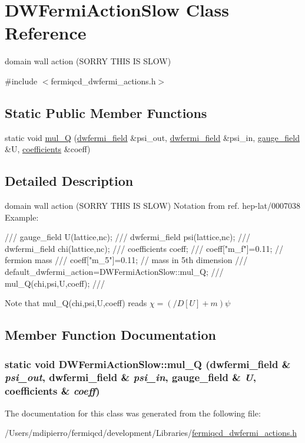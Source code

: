 \hypertarget{class_d_w_fermi_action_slow}{
\section{DWFermiActionSlow Class Reference}
\label{class_d_w_fermi_action_slow}
}


domain wall action (SORRY THIS IS SLOW)  


{\ttfamily \#include $<$fermiqcd\_\-dwfermi\_\-actions.h$>$}\subsection*{Static Public Member Functions}
\begin{DoxyCompactItemize}
\item 
static void \hyperlink{class_d_w_fermi_action_slow_a1d869c15a2d6fd01059d4088693e1898}{mul\_\-Q} (\hyperlink{classdwfermi__field}{dwfermi\_\-field} \&psi\_\-out, \hyperlink{classdwfermi__field}{dwfermi\_\-field} \&psi\_\-in, \hyperlink{classgauge__field}{gauge\_\-field} \&U, \hyperlink{classcoefficients}{coefficients} \&coeff)
\end{DoxyCompactItemize}


\subsection{Detailed Description}
domain wall action (SORRY THIS IS SLOW) Notation from ref. hep-\/lat/0007038 Example: \begin{DoxyVerb}
/// gauge_field U(lattice,nc);
/// dwfermi_field psi(lattice,nc);
/// dwfermi_field chi(lattice,nc);
/// coefficients coeff;
/// coeff["m_f"]=0.11; // fermion mass
/// coeff["m_5"]=0.11; // mass in 5th dimension
/// default_dwfermi_action=DWFermiActionSlow::mul_Q;
/// mul_Q(chi,psi,U,coeff);
/// \end{DoxyVerb}
 Note that mul\_\-Q(chi,psi,U,coeff) reads $ \chi=(/\!\!\!D[U]+m)\psi $ 

\subsection{Member Function Documentation}
\hypertarget{class_d_w_fermi_action_slow_a1d869c15a2d6fd01059d4088693e1898}{
\subsubsection[{mul\_\-Q}]{\setlength{\rightskip}{0pt plus 5cm}static void DWFermiActionSlow::mul\_\-Q ({\bf dwfermi\_\-field} \& {\em psi\_\-out}, \/  {\bf dwfermi\_\-field} \& {\em psi\_\-in}, \/  {\bf gauge\_\-field} \& {\em U}, \/  {\bf coefficients} \& {\em coeff})}}
\label{class_d_w_fermi_action_slow_a1d869c15a2d6fd01059d4088693e1898}


The documentation for this class was generated from the following file:\begin{DoxyCompactItemize}
\item 
/Users/mdipierro/fermiqcd/development/Libraries/\hyperlink{fermiqcd__dwfermi__actions_8h}{fermiqcd\_\-dwfermi\_\-actions.h}\end{DoxyCompactItemize}
